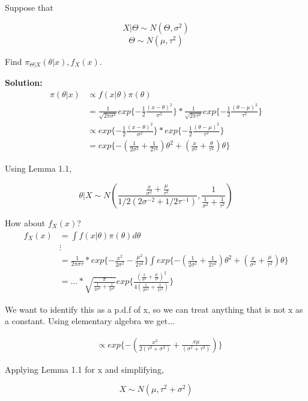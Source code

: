\documentclass[11pt,fleqn]{book} %
\begin{document}
\begin{example}
	Suppose that

			$$X | \Theta \sim N(\Theta, \sigma^2) $$
			$$\Theta \sim N(\mu, \tau^2)$$

	Find $\pi_{\Theta|X} (\theta|x), f_X(x)$. 

	\textbf{Solution:}\\

	\begin{align*}
		\pi(\theta|x) &\propto f(x|\theta) \pi(\theta)\\
				&= \frac{1}{\sqrt{2 \pi \sigma^2}} exp\{-\frac{1}{2} \frac{(x-\theta)^2}{\sigma^2}\} * \frac{1}{\sqrt{2 \pi \tau^2}} exp\{-\frac{1}{2} \frac{(\theta -\mu)^2}{\tau^2}\}\\
				&\propto  exp\{-\frac{1}{2} \frac{(x-\theta)^2}{\sigma^2}\} *  exp\{-\frac{1}{2} \frac{(\theta -\mu)^2}{\tau^2}\}\\
				&= exp\{-(\frac{1}{2\sigma^2} + \frac{1}{2 \tau^2})\theta^2 + (\frac{x}{\sigma^2} + \frac{\theta}{\tau^2})\theta\}
	\end{align*}

Using  Lemma 1.1, 

		$$\theta|X \sim N\left(\frac{\frac{x}{\sigma^2} + \frac{\mu}{\tau^2}}{1/2(2\sigma^{-2} + 1/2\tau^{-1} )}, \frac{1}{\frac{1}{\sigma^2} + \frac{1}{\tau^2}}\right) $$

How about $f_X(x)$?\\

		\begin{align*}
			f_X(x) &= \int f(x|\theta) \pi(\theta) d\theta\\
					&\vdots\\
					&= \frac{1}{{2 \pi \sigma \tau}} * exp\{-\frac{x^2}{2\sigma^2} -  \frac{\mu^2}{2\tau^2}\} \int exp\{- (\frac{1}{2\sigma^2} + \frac{1}{2 \tau^2})\theta^2 + (\frac{x}{\sigma^2} + \frac{\mu}{\tau^2})\theta \}\\
					&= \dots * \sqrt{\frac{\pi}{\frac{1}{2\sigma^2} + \frac{1}{2 \tau^2}}} exp\{\frac{(\frac{x}{\sigma^2} + \frac{\mu}{\tau^2})^2}{4 (\frac{1}{2\sigma^2} + \frac{1}{2\tau^2})}\}
		\end{align*}

		We want to identify this as a p.d.f of x, so we can treat anything that is not x as a constant. Using elementary algebra we get...

		\begin{align*}
			&\propto exp \{- (\frac{x^2}{2(\tau^2 + \sigma^2)} + \frac{x \mu}{(\sigma^2 + \tau^2)}) \}
		\end{align*}

		Applying Lemma 1.1 for x and simplifying, 

				$$X \sim N(\mu, \tau^2 + \sigma^2) $$


\end{example}
\end{document}
